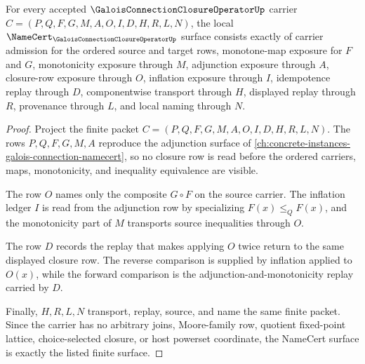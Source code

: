 \begin{theorem}
\label{thm:galois-connection-closure-operator-namecert-obligations}
For every accepted $\GaloisConnectionClosureOperatorUp$ carrier $C=(P,Q,F,G,M,A,O,I,D,H,R,L,N)$, the local $\NameCert_{\GaloisConnectionClosureOperatorUp}$ surface consists exactly of carrier admission for the ordered source and target rows, monotone-map exposure for $F$ and $G$, monotonicity exposure through $M$, adjunction exposure through $A$, closure-row exposure through $O$, inflation exposure through $I$, idempotence replay through $D$, componentwise transport through $H$, displayed replay through $R$, provenance through $L$, and local naming through $N$.
\end{theorem}
\begin{proof}
Project the finite packet $C=(P,Q,F,G,M,A,O,I,D,H,R,L,N)$. The rows $P,Q,F,G,M,A$ reproduce the adjunction surface of \autoref{ch:concrete-instances-galois-connection-namecert}, so no closure row is read before the ordered carriers, maps, monotonicity, and inequality equivalence are visible.

The row $O$ names only the composite $G\circ F$ on the source carrier. The inflation ledger $I$ is read from the adjunction row by specializing $F(x)\leq_Q F(x)$, and the monotonicity part of $M$ transports source inequalities through $O$.

The row $D$ records the replay that makes applying $O$ twice return to the same displayed closure row. The reverse comparison is supplied by inflation applied to $O(x)$, while the forward comparison is the adjunction-and-monotonicity replay carried by $D$.

Finally, $H,R,L,N$ transport, replay, source, and name the same finite packet. Since the carrier has no arbitrary joins, Moore-family row, quotient fixed-point lattice, choice-selected closure, or host powerset coordinate, the NameCert surface is exactly the listed finite surface.
\end{proof}

